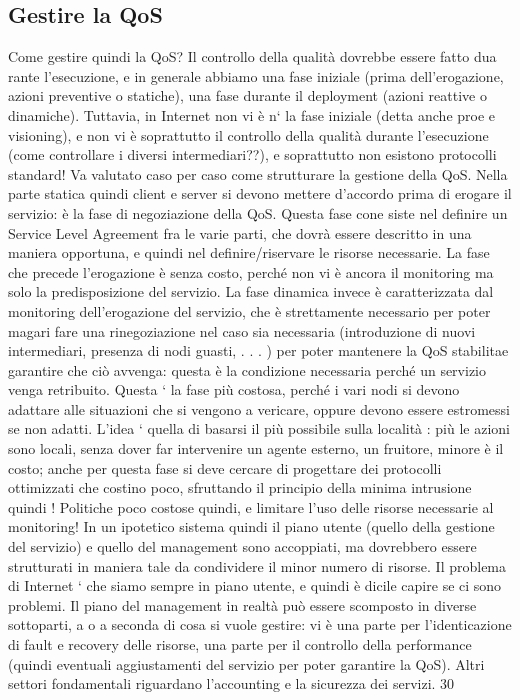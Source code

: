 \subsection{Gestire la QoS}
Come gestire quindi la QoS? Il controllo della qualità dovrebbe essere fatto dua
rante l'esecuzione, e in generale abbiamo una fase iniziale (prima dell'erogazione,
azioni preventive o statiche), una fase durante il deployment (azioni reattive o
dinamiche). Tuttavia, in Internet non vi è n` la fase iniziale (detta anche proe e
visioning), e non vi è soprattutto il controllo della qualità durante l'esecuzione
(come controllare i diversi intermediari??), e soprattutto non esistono protocolli
standard! Va valutato caso per caso come strutturare la gestione della QoS.
Nella parte statica quindi client e server si devono mettere d'accordo prima
di erogare il servizio: è la fase di negoziazione della QoS. Questa fase cone
siste nel definire un Service Level Agreement fra le varie parti, che dovrà essere
descritto in una maniera opportuna, e quindi nel definire/riservare le risorse necessarie. La fase che precede
l'erogazione è senza costo, perché non vi è ancora
il monitoring ma solo la predisposizione del servizio.
La fase dinamica invece è caratterizzata dal monitoring dell'erogazione del
servizio, che è strettamente necessario per poter magari fare una rinegoziazione
nel caso sia necessaria (introduzione di nuovi intermediari, presenza di nodi
guasti, . . . ) per poter mantenere la QoS stabilitae garantire che ciò avvenga:
questa è la condizione necessaria perché un servizio venga retribuito. Questa `
la fase più costosa, perché i vari nodi si devono adattare alle situazioni che si
vengono a vericare, oppure devono essere estromessi se non adatti. L'idea `
quella di basarsi il più possibile sulla località : più le azioni sono locali, senza
dover far intervenire un agente esterno, un fruitore, minore è il costo; anche per
questa fase si deve cercare di progettare dei protocolli ottimizzati che costino
poco, sfruttando il principio della minima intrusione quindi ! Politiche poco
costose quindi, e limitare l'uso delle risorse necessarie al monitoring! In un
ipotetico sistema quindi il piano utente (quello della gestione del servizio) e
quello del management sono accoppiati, ma dovrebbero essere strutturati in
maniera tale da condividere il minor numero di risorse. Il problema di Internet
` che siamo sempre in piano utente, e quindi è dicile capire se ci sono problemi.
Il piano del management in realtà può essere scomposto in diverse sottoparti,
a o
a seconda di cosa si vuole gestire: vi è una parte per l'identicazione di fault
e recovery delle risorse, una parte per il controllo della performance (quindi
eventuali aggiustamenti del servizio per poter garantire la QoS). Altri settori
fondamentali riguardano l'accounting e la sicurezza dei servizi.
30
